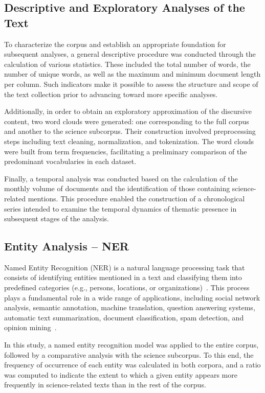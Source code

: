 \documentclass[pdflatex,sn-mathphys-num,iicol]{sn-jnl}
\begin{document}
	
	
	\subsection{Descriptive and Exploratory Analyses of the Text}\label{subsec:descriptive}
	
	To characterize the corpus and establish an appropriate foundation for subsequent analyses, a general descriptive procedure was conducted through the calculation of various statistics. These included the total number of words, the number of unique words, as well as the maximum and minimum document length per column. Such indicators make it possible to assess the structure and scope of the text collection prior to advancing toward more specific analyses.
	
	Additionally, in order to obtain an exploratory approximation of the discursive content, two word clouds were generated: one corresponding to the full corpus and another to the science subcorpus. Their construction involved preprocessing steps including text cleaning, normalization, and tokenization. The word clouds were built from term frequencies, facilitating a preliminary comparison of the predominant vocabularies in each dataset.
	
	Finally, a temporal analysis was conducted based on the calculation of the monthly volume of documents and the identification of those containing science-related mentions. This procedure enabled the construction of a chronological series intended to examine the temporal dynamics of thematic presence in subsequent stages of the analysis.
	
	\subsection{Entity Analysis -- NER}\label{subsec:ner}
	
	Named Entity Recognition (NER) is a natural language processing task that consists of identifying entities mentioned in a text and classifying them into predefined categories (e.g., persons, locations, or organizations)~\cite{Jehangir2023}. This process plays a fundamental role in a wide range of applications, including social network analysis, semantic annotation, machine translation, question answering systems, automatic text summarization, document classification, spam detection, and opinion mining~\cite{Jehangir2023}.
	
	In this study, a named entity recognition model was applied to the entire corpus, followed by a comparative analysis with the science subcorpus. To this end, the frequency of occurrence of each entity was calculated in both corpora, and a ratio was computed to indicate the extent to which a given entity appears more frequently in science-related texts than in the rest of the corpus.
	
\end{document}
